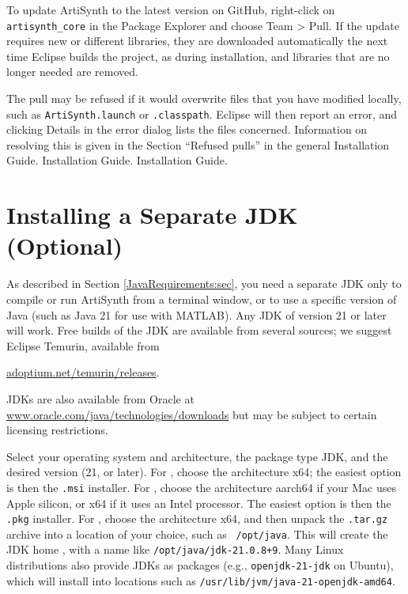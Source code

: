 To update ArtiSynth to the latest version on GitHub, right-click on
{\tt artisynth\_core} in the Package Explorer and choose {\sf Team >
Pull}. If the update requires new or different libraries, they are
downloaded automatically the next time Eclipse builds the project, as
during installation, and libraries that are no longer needed are
removed.

The pull may be refused if it would overwrite files that you have
modified locally, such as {\tt ArtiSynth.launch} or {\tt .classpath}.
Eclipse will then report an error, and clicking {\sf Details} in the
error dialog lists the files concerned. Information on resolving
this is given in the Section ``Refused pulls'' in the general
\ifLinux
{}%
{Installation Guide}.
\fi
\ifWindows
{}%
{Installation Guide}.
\fi
\ifMacOS
{}%
{Installation Guide}.
\fi

\section{Installing a Separate JDK (Optional)}
\label{InstallingJDK:sec}

As described in Section \ref{JavaRequirements:sec}, you need a
separate JDK only to compile or run ArtiSynth from a terminal window,
or to use a specific version of Java (such as Java 21 for use with
MATLAB). Any JDK of version 21 or later will work. Free builds of the
JDK are available from several sources; we suggest Eclipse Temurin,
available from

\href{https://adoptium.net/temurin/releases/}%
{adoptium.net/temurin/releases}.

\begin{sideblock}
JDKs are also available from Oracle at 
\href{https://www.oracle.com/java/technologies/downloads/}%
{www.oracle.com/java/technologies/downloads} 
but may be subject to certain licensing restrictions.
\end{sideblock}

Select your operating system and architecture, the package type {\sf
JDK}, and the desired version (21, or later).
\ifWindows
For \SYSTEM{}, choose the architecture {\sf x64}; the easiest option
is then the {\tt .msi} installer.
\fi
\ifMacOS
For \SYSTEM{}, choose the architecture {\sf aarch64} if your Mac uses
Apple silicon, or {\sf x64} if it uses an Intel processor. The easiest
option is then the {\tt .pkg} installer.
\fi
\ifLinux
For \SYSTEM{}, choose the architecture {\sf x64}, and then unpack the
{\tt .tar.gz} archive into a location of your choice, such as {\tt
/opt/java}. This will create the JDK home \directory{}, with a name like
{\tt /opt/java/jdk-21.0.8+9}.  Many Linux distributions also provide JDKs
as packages (e.g., {\tt openjdk-21-jdk} on Ubuntu), which will install
into locations such as {\tt /usr/lib/jvm/java-21-openjdk-amd64}.
\fi

